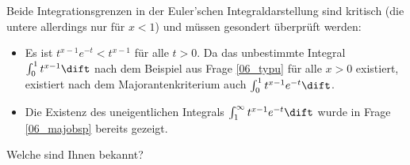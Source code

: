   \begin{antwort}
    Beide Integrationsgrenzen in der Euler'schen Integraldarstellung
    sind kritisch (die untere allerdings nur für $x<1$)
    und müssen gesondert überprüft werden: 
    {\setlength{\labelsep}{5mm}
      \begin{itemize}[2mm]
      \item[\desc{i}] Es ist $t^{x-1} e^{-t} < t^{x-1}$ für alle $t>0$. 
        Da das unbestimmte Integral $\int_0^1 t^{x-1}\dift$ 
        nach dem Beispiel  aus Frage 
        \ref{06_typu} für alle $x>0$ existiert, existiert 
        nach dem Majorantenkriterium auch $\int_0^1 t^{x-1}e^{-t} \dift$.\\[-3mm]
      \item[\desc{ii}] Die Existenz des uneigentlichen Integrals 
        $\int_1^\infty t^{x-1}e^{-t} \dift$ 
        wurde in Frage \ref{06_majobsp} bereits gezeigt. 
        \AntEnd
      \end{itemize}}
  \end{antwort}

  \begin{frage}
    Welche  sind Ihnen 
    bekannt?
  \end{frage}

